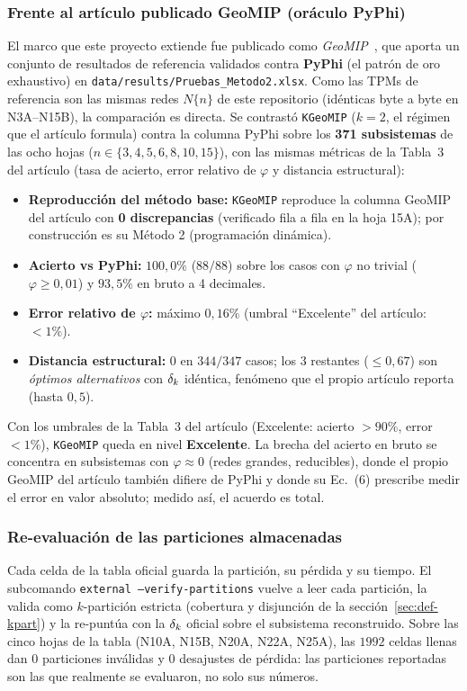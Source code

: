 \documentclass[11pt,letterpaper]{article}
\begin{document}
\subsubsection{Frente al artículo publicado GeoMIP (oráculo PyPhi)}
\label{sec:val-geomip}
El marco que este proyecto extiende fue publicado como \emph{GeoMIP}~\cite{geomip}, que
aporta un conjunto de resultados de referencia validados contra \textbf{PyPhi} (el patrón
de oro exhaustivo) en \texttt{data/results/Pruebas\_Metodo2.xlsx}. Como las TPMs de
referencia son las mismas redes $N\{n\}$ de este repositorio (idénticas byte a byte en
N3A--N15B), la comparación es directa. Se contrastó \texttt{KGeoMIP} ($k=2$, el régimen
que el artículo formula) contra la columna PyPhi sobre los \textbf{371 subsistemas} de las
ocho hojas ($n\in\{3,4,5,6,8,10,15\}$), con las mismas métricas de la Tabla~3 del
artículo (tasa de acierto, error relativo de $\varphi$ y distancia estructural):
\begin{itemize}
	\item \textbf{Reproducción del método base:} \texttt{KGeoMIP} reproduce la columna
	      GeoMIP del artículo con \textbf{0 discrepancias} (verificado fila a fila en la hoja
	      15A); por construcción es su Método 2 (programación dinámica).
	\item \textbf{Acierto vs PyPhi:} $100{,}0\%$ ($88/88$) sobre los casos con
	      $\varphi$ no trivial ($\varphi\ge 0{,}01$) y $93{,}5\%$ en bruto a 4 decimales.
	\item \textbf{Error relativo de $\varphi$:} máximo $0{,}16\%$ (umbral ``Excelente''
	      del artículo: $<1\%$).
	\item \textbf{Distancia estructural:} $0$ en $344/347$ casos; los $3$ restantes
	      ($\le 0{,}67$) son \emph{óptimos alternativos} con $\delta_k$ idéntica, fenómeno que el
	      propio artículo reporta (hasta $0{,}5$).
\end{itemize}
Con los umbrales de la Tabla~3 del artículo (Excelente: acierto $>90\%$, error
$<1\%$), \texttt{KGeoMIP} queda en nivel \textbf{Excelente}. La brecha del acierto en
bruto se concentra en subsistemas con $\varphi\approx 0$ (redes grandes, reducibles),
donde el propio GeoMIP del artículo también difiere de PyPhi y donde su Ec.~(6) prescribe
medir el error en valor absoluto; medido así, el acuerdo es total.

\subsubsection{Re-evaluación de las particiones almacenadas}
Cada celda de la tabla oficial guarda la partición, su pérdida y su tiempo. El
subcomando \texttt{external --verify-partitions} vuelve a leer cada partición, la
valida como $k$-partición estricta (cobertura y disjunción de la
sección~\ref{sec:def-kpart}) y la re-puntúa con la $\delta_k$ oficial sobre el
subsistema reconstruido. Sobre las cinco hojas de la tabla (N10A, N15B, N20A, N22A,
N25A), las $1992$ celdas llenas dan $0$ particiones inválidas y $0$ desajustes
de pérdida: las particiones reportadas son las que realmente se evaluaron, no solo
sus números.
\end{document}
